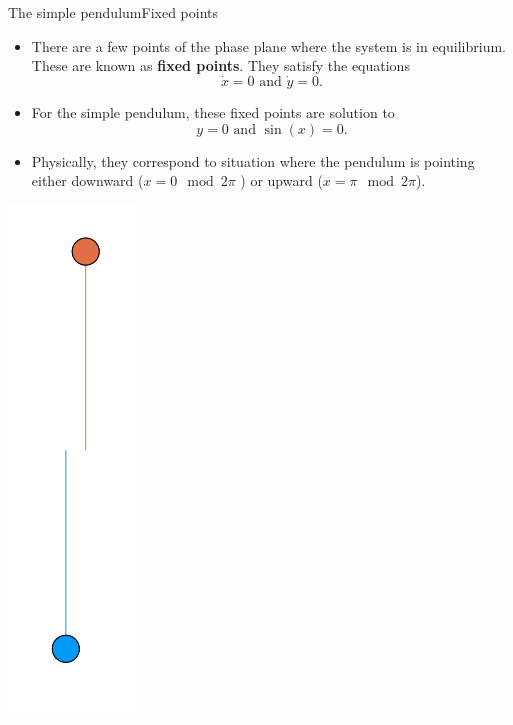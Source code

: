 \documentclass[usenames,dvipsnames,svgnames,10pt,aspectratio=169]{beamer}
\begin{document}
\begin{frame}[t, c]{The simple pendulum}{Fixed points}
	\begin{minipage}{.68\textwidth}
		\begin{itemize}
			\item There are a few points of the phase plane where the system is in equilibrium.
			These are known as \alert{\textbf{fixed points}}.
			They satisfy the equations
			\[
				\dot{x} = 0 \text{ and } \dot{y} = 0.
			\]

			\item For the simple pendulum, these fixed points are solution to
			\[
				y = 0 \text{ and } \sin(x) = 0.
			\]

			\item Physically, they correspond to situation where the pendulum is pointing either downward (\( x = 0 \mod 2\pi\) ) or upward (\( x = \pi \mod 2\pi \)).
		\end{itemize}
	\end{minipage}%
	\hfill
	\begin{minipage}{.28\textwidth}
		\centering
		\includegraphics[height=.666\textheight]{pendulum_equilibria}
	\end{minipage}

	\vspace{1cm}
\end{frame}
\end{document}

